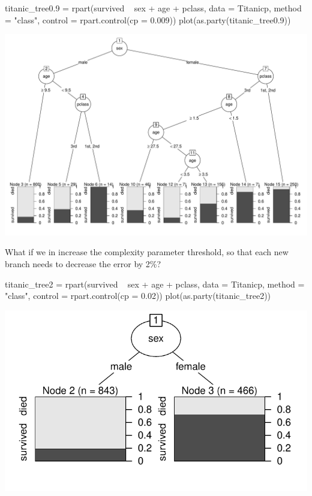 \documentclass[a4paper]{article}
\begin{document}
\begin{Schunk}
\begin{Sinput}
titanic_tree0.9 = rpart(survived ~ sex + age + pclass, data = Titanicp, method = "class", 
                      control = rpart.control(cp = 0.009))
plot(as.party(titanic_tree0.9))
\end{Sinput}


{\centering \includegraphics[width=0.95\linewidth]{figure/listings-unnamed-chunk-438-1} 

}

\end{Schunk}
What if we in increase the complexity parameter threshold, so that each new branch needs to decrease the error by 2\%?
\begin{Schunk}
\begin{Sinput}
titanic_tree2 = rpart(survived ~ sex + age + pclass, data = Titanicp, method = "class", 
                      control = rpart.control(cp = 0.02))
plot(as.party(titanic_tree2))
\end{Sinput}


{\centering \includegraphics[width=0.7\linewidth]{figure/listings-unnamed-chunk-439-1} 

}

\end{Schunk}
\end{document}
